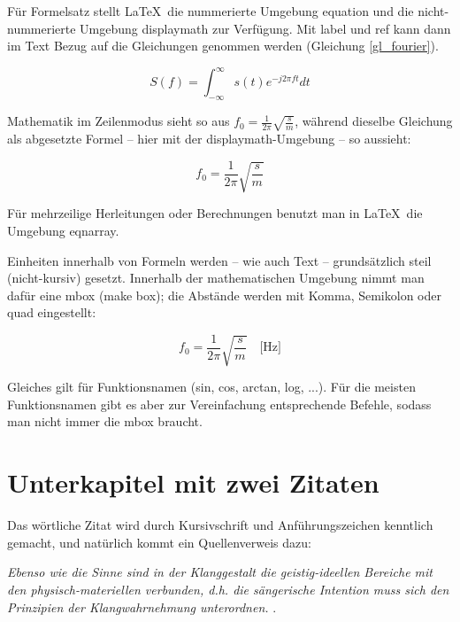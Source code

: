 Für Formelsatz stellt \LaTeX\ die nummerierte Umgebung equation und die nicht-nummerierte Umgebung displaymath zur Verfügung. Mit label und ref kann dann im Text Bezug auf die Gleichungen genommen werden (Gleichung \ref{gl_fourier}). 

\begin{equation}\label{gl_fourier}
S(f) = \int_{-\infty}^{\infty} s(t)e^{-j 2 \pi f t}dt
\end{equation}

Mathematik im Zeilenmodus sieht so aus $f_0 = \frac{1}{2\pi} \sqrt{\frac{s}{m}}$, während dieselbe Gleichung als abgesetzte Formel -- hier mit der displaymath-Umgebung -- so aussieht: 

\begin{displaymath}
f_0 = \frac{1}{2\pi} \sqrt{\frac{s}{m}} 
\end{displaymath}

Für mehrzeilige Herleitungen oder Berechnungen benutzt man in \LaTeX\ die Umgebung eqnarray.

Einheiten innerhalb von Formeln werden -- wie auch Text -- grundsätzlich steil (nicht-kursiv) gesetzt. Innerhalb der mathematischen Umgebung nimmt man dafür eine mbox (make box); die Abstände werden mit Komma, Semikolon oder quad eingestellt:

\begin{displaymath}
f_0 = \frac{1}{2\pi} \sqrt{\frac{s}{m}} \quad \mbox{[Hz]}
\end{displaymath}

Gleiches gilt für Funktionsnamen (sin, cos, arctan, log, ...). Für die meisten Funktionsnamen gibt es aber zur Vereinfachung entsprechende Befehle, sodass man nicht immer die mbox braucht.


\section{Unterkapitel mit zwei Zitaten}

Das wörtliche Zitat wird durch Kursivschrift und Anführungszeichen kenntlich gemacht, und natürlich kommt ein Quellenverweis dazu:

\medskip
\emph{\glqq Ebenso wie die Sinne sind in der Klanggestalt die geistig-ideellen Bereiche mit den physisch-materiellen verbunden, d.h. die sängerische Intention muss sich den Prinzipien der Klangwahrnehmung unterordnen.\grqq} \citep[111]{sowodniok}.
\medskip

